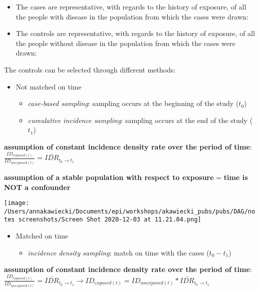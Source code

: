 \documentclass[
]{article}
\providecommand{\tightlist}{%
  \setlength{\itemsep}{0pt}\setlength{\parskip}{0pt}}
\begin{document}
\begin{itemize}
\item
  The cases are representative, with regards to the history of exposure,
  of all the people with disease in the population from which the cases
  were drawn:
\item
  The controls are representative, with regards to the history of
  exposure, of all the people without disease in the population from
  which the cases were drawn:
\end{itemize}

The controls can be selected through different methods:

\begin{itemize}
\item
  Not matched on time

  \begin{itemize}
  \item
    \emph{case-based sampling}: sampling occurs at the beginning of the
    study (\(t_0\))
  \item
    \emph{cumulative incidence sampling}: sampling occurs at the end of
    the study (\(t_1\))
  \end{itemize}
\end{itemize}

\textbf{assumption of constant incidence density rate over the period of
time}:
\(\frac{ID_{exposed(t)}}{ID_{unexposed(t)}}=\bar{IDR}_{t_0 \to t_1}\)

\textbf{assumption of a stable population with respect to exposure} =
\textbf{time is NOT a confounder}

\texttt{[image: /Users/annakawiecki/Documents/epi/workshops/akawiecki\_pubs/pubs/DAG/notes screenshots/Screen Shot 2020-12-03 at 11.21.04.png]}

\begin{itemize}
\item
  Matched on time

  \begin{itemize}
  \tightlist
  \item
    \emph{incidence density sampling}: match on time with the cases
    (\(t_0 - t_1\))
  \end{itemize}
\end{itemize}

\textbf{assumption of constant incidence density rate over the period of
time}:
\(\frac{ID_{exposed(t)}}{ID_{unexposed(t)}}=\bar{IDR}_{t_0 \to t_1} \to ID_{exposed(t)} = ID_{unexposed(t)} * \bar{IDR}_{t_0 \to t_1}\)
\end{document}
